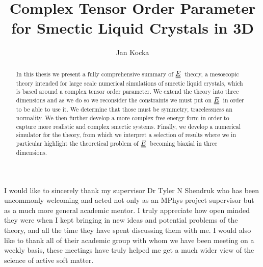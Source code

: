 \documentclass[12pt]{article}
\newcommand{\duf}[2]{\stackunder[0.5pt]{\stackunder[0.8pt]{\stackunder[1pt]{\ensuremath{#1}}{\rule{\widthof{\ensuremath{#2}}*\real{0.9}}{.1ex}}}{\rule{\widthof{\ensuremath{#2}}*\real{0.9}}{.1ex}}}{}}
\newcommand{\du}[1]{\duf{#1}{#1}}
\newcommand{\EE}{\ensuremath{\du{E}}}
\begin{document}
\title{Complex Tensor Order Parameter for Smectic Liquid Crystals in 3D}
\author{Jan Kocka}

\begin{abstract}
    In this thesis we present a fully comprehensive summary of \EE\ theory, a mesoscopic theory intended for large scale numerical simulations of smectic liquid crystals, which is based around a complex tensor order parameter.
    We extend the theory into three dimensions and as we do so we reconsider the constraints we must put on \EE\ in order to be able to use it.
    We determine that those must be symmetry, tracelessness an normality.
    We then further develop a more complex free energy form in order to capture more realistic and complex smectic systems.
    Finally, we develop a numerical simulator for the theory, from which we interpret a selection of results where we in particular highlight the theoretical problem of \EE\ becoming biaxial in three dimensions.
\end{abstract}

\maketitle

\acknowledgments
    I would like to sincerely thank my supervisor Dr Tyler N Shendruk who has been uncommonly welcoming and acted not only as an MPhys project supervisor but as a much more general academic mentor.
    I truly appreciate how open minded they were when I kept bringing in new ideas and potential problems of the theory, and all the time they have spent discussing them with me.
    I would also like to thank all of their academic group with whom we have been meeting on a weekly basis, these meetings have truly helped me get a much wider view of the science of active soft matter.

\newpage
\end{document}
